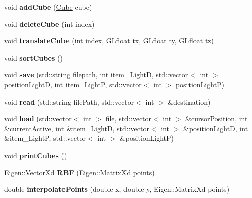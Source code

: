 \begin{DoxyCompactItemize}
\item 
\mbox{\label{classglimac_1_1CubeList_adaa2b032e1ee67cd7dc9feaab94edc6d}} 
void {\bfseries add\+Cube} (\hyperlink{classglimac_1_1Cube}{Cube} cube)
\item 
\mbox{\label{classglimac_1_1CubeList_ac8ffe918d3ff2788edd5c5bbfba45135}} 
void {\bfseries delete\+Cube} (int index)
\item 
\mbox{\label{classglimac_1_1CubeList_ace7f18a7aab16f50e724eab7d66d27b2}} 
void {\bfseries translate\+Cube} (int index, G\+Lfloat tx, G\+Lfloat ty, G\+Lfloat tz)
\item 
\mbox{\label{classglimac_1_1CubeList_af6615c0db1a97fcae5df6f27de71b6d8}} 
void {\bfseries sort\+Cubes} ()
\item 
\mbox{\label{classglimac_1_1CubeList_a9e7ac57439f018d89b71c6071efd48e6}} 
void {\bfseries save} (std\+::string filepath, int item\+\_\+\+LightD, std\+::vector$<$ int $>$ position\+LightD, int item\+\_\+\+LightP, std\+::vector$<$ int $>$ position\+LightP)
\item 
\mbox{\label{classglimac_1_1CubeList_a59d87cac2e218d617940ccdab5235b31}} 
void {\bfseries read} (std\+::string file\+Path, std\+::vector$<$ int $>$ \&destination)
\item 
\mbox{\label{classglimac_1_1CubeList_a6f615ea1238b29f8e19859b528ac6f26}} 
void {\bfseries load} (std\+::vector$<$ int $>$ file, std\+::vector$<$ int $>$ \&cursor\+Position, int \&current\+Active, int \&item\+\_\+\+LightD, std\+::vector$<$ int $>$ \&position\+LightD, int \&item\+\_\+\+LightP, std\+::vector$<$ int $>$ \&position\+LightP)
\item 
\mbox{\label{classglimac_1_1CubeList_a5c3e997708642903eb6b4c806de0cdf9}} 
void {\bfseries print\+Cubes} ()
\item 
\mbox{\label{classglimac_1_1CubeList_ab87f2ed50f1c7e0187c58bb17926234e}} 
Eigen\+::\+Vector\+Xd {\bfseries R\+BF} (Eigen\+::\+Matrix\+Xd points)
\item 
\mbox{\label{classglimac_1_1CubeList_a811e3f908710eb469fc681ec1a5f29c7}} 
double {\bfseries interpolate\+Points} (double x, double y, Eigen\+::\+Matrix\+Xd points)
\end{DoxyCompactItemize}
